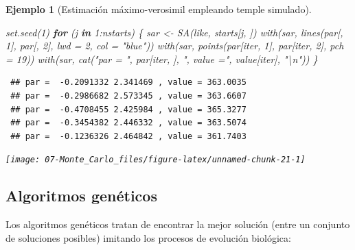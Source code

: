 \documentclass[
]{book}
\newenvironment{Shaded}{\begin{snugshade}}{\end{snugshade}}
\newcommand{\AttributeTok}[1]{\textcolor[rgb]{0.77,0.63,0.00}{#1}}
\newcommand{\ControlFlowTok}[1]{\textcolor[rgb]{0.13,0.29,0.53}{\textbf{#1}}}
\newcommand{\DecValTok}[1]{\textcolor[rgb]{0.00,0.00,0.81}{#1}}
\newcommand{\FunctionTok}[1]{\textcolor[rgb]{0.00,0.00,0.00}{#1}}
\newcommand{\NormalTok}[1]{#1}
\newcommand{\OtherTok}[1]{\textcolor[rgb]{0.56,0.35,0.01}{#1}}
\newcommand{\SpecialCharTok}[1]{\textcolor[rgb]{0.00,0.00,0.00}{#1}}
\newcommand{\StringTok}[1]{\textcolor[rgb]{0.31,0.60,0.02}{#1}}
\theoremstyle{break}
\newtheorem{example}{Ejemplo}[chapter]
\theoremstyle{nonumberplain}
\begin{document}
\begin{example}[Estimación máximo-verosimil empleando temple simulado]
\begin{Shaded}
\begin{Highlighting}[]
\FunctionTok{set.seed}\NormalTok{(}\DecValTok{1}\NormalTok{)}
\ControlFlowTok{for}\NormalTok{ (j }\ControlFlowTok{in} \DecValTok{1}\SpecialCharTok{:}\NormalTok{nstarts) \{}
\NormalTok{  sar }\OtherTok{\textless{}{-}} \FunctionTok{SA}\NormalTok{(like, starts[j, ])}
  \FunctionTok{with}\NormalTok{(sar, }\FunctionTok{lines}\NormalTok{(par[, }\DecValTok{1}\NormalTok{], par[, }\DecValTok{2}\NormalTok{], }\AttributeTok{lwd =} \DecValTok{2}\NormalTok{, }\AttributeTok{col =} \StringTok{"blue"}\NormalTok{))}
  \FunctionTok{with}\NormalTok{(sar, }\FunctionTok{points}\NormalTok{(par[iter, }\DecValTok{1}\NormalTok{], par[iter, }\DecValTok{2}\NormalTok{], }\AttributeTok{pch =} \DecValTok{19}\NormalTok{))}
  \FunctionTok{with}\NormalTok{(sar, }\FunctionTok{cat}\NormalTok{(}\StringTok{"par = "}\NormalTok{, par[iter, ], }\StringTok{", value ="}\NormalTok{, value[iter], }\StringTok{"}\SpecialCharTok{\textbackslash{}n}\StringTok{"}\NormalTok{))}
\NormalTok{\}}
\end{Highlighting}
\end{Shaded}

\begin{verbatim}
 ## par =  -0.2091332 2.341469 , value = 363.0035 
 ## par =  -0.2986682 2.573345 , value = 363.6607 
 ## par =  -0.4708455 2.425984 , value = 365.3277 
 ## par =  -0.3454382 2.446332 , value = 363.5074 
 ## par =  -0.1236326 2.464842 , value = 361.7403
\end{verbatim}

\begin{center}\texttt{[image: 07-Monte\_Carlo\_files/figure-latex/unnamed-chunk-21-1]} \end{center}

\end{example}

\hypertarget{algoritmos-genuxe9ticos}{%
\subsection{Algoritmos genéticos}\label{algoritmos-genuxe9ticos}}

Los algoritmos genéticos tratan de encontrar la mejor solución
(entre un conjunto de soluciones posibles) imitando los procesos de
evolución biológica:
\end{document}
